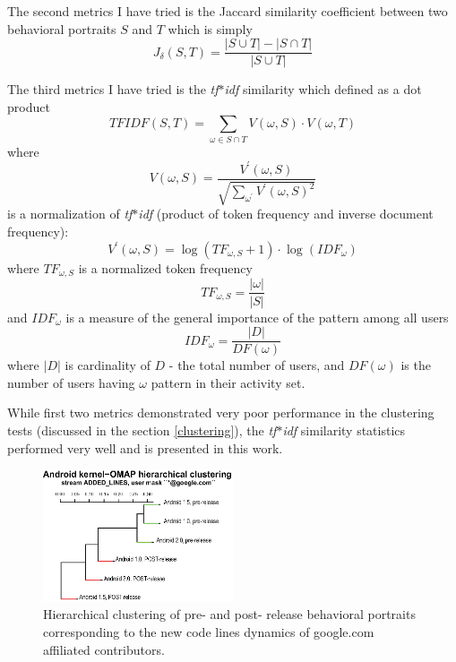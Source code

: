 \documentclass[conference]{worldcomp}
\begin{document}
The second metrics I have tried is the Jaccard similarity coefficient between two behavioral portraits
$S$ and $T$ which is simply 
\begin{equation}
J_{\delta}(S,T) = \frac{|S\cup T| - |S\cap T|}{|S\cup T|}
\end{equation} 

The third metrics I have tried is the \textit{tf$\ast$idf} similarity which defined as a dot product 
\begin{equation}
 TFIDF(S,T) = \sum_{\omega \in S \cap T} V(\omega, S) \cdot V(\omega, T)
\end{equation} 
where 
\begin{equation}
 V(\omega, S) = \frac { V^{\prime} (\omega,S) } { \sqrt{ \sum_{\omega^{\prime}} V^{\prime} (\omega,S)^{2}} }
\end{equation} 
is a normalization of \textit{tf$\ast$idf} (product of token frequency and inverse document frequency):
\begin{equation}
 V^{\prime} (\omega,S) = \log(TF_{\omega, S} +1) \cdot \log(IDF_{\omega})
\end{equation} 
where $TF_{\omega, S}$ is a normalized token frequency
\begin{equation}
 TF_{\omega, S} = \frac{|\omega|}{|S|}
\end{equation} 
and $IDF_{\omega}$ is a measure of the general importance of the pattern among all users
\begin{equation}
 IDF_{\omega} = \frac{|D|}{DF(\omega)}
\end{equation} 
where $|D|$ is cardinality of $D$ - the total number of users, and $DF(\omega)$ is the number of users 
having $\omega$ pattern in their activity set. 

While first two metrics demonstrated very poor performance in the clustering tests (discussed in the section \ref{clustering}), 
the \textit{tf$\ast$idf} similarity statistics performed very well and is presented in this work.

\begin{figure}[t]
  \centering
  \includegraphics[width=0.5\textwidth]{figures/omap-hclust.eps}
  \caption{Hierarchical clustering of pre- and post- release behavioral portraits corresponding to the new code lines dynamics of google.com affiliated contributors.}
  \label{fig:kernel_cluster}
\end{figure}
\end{document}
